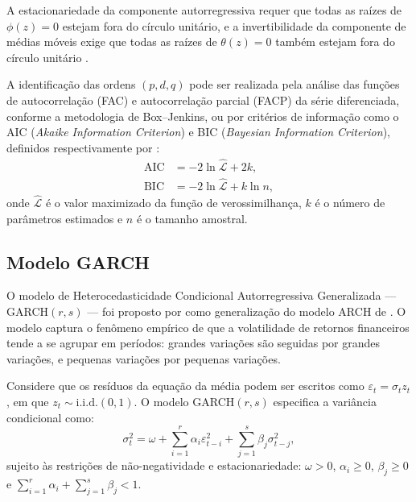 A estacionariedade da componente autorregressiva requer que todas as raízes
de $\phi(z) = 0$ estejam fora do círculo unitário, e a invertibilidade da
componente de médias móveis exige que todas as raízes de $\theta(z) = 0$
também estejam fora do círculo unitário \cite{box1970}.

A identificação das ordens $(p, d, q)$ pode ser realizada pela análise das
funções de autocorrelação (FAC) e autocorrelação parcial (FACP) da série
diferenciada, conforme a metodologia de Box--Jenkins, ou por critérios de
informação como o AIC (\emph{Akaike Information Criterion}) e BIC
(\emph{Bayesian Information Criterion}), definidos respectivamente
por \cite{akaike1974,schwarz1978}:
%
\begin{align}
    \text{AIC} &= -2\ln\hat{\mathcal{L}} + 2k, \label{eq:aic}\\
    \text{BIC} &= -2\ln\hat{\mathcal{L}} + k\ln n, \label{eq:bic}
\end{align}
%
onde $\hat{\mathcal{L}}$ é o valor maximizado da função de verossimilhança,
$k$ é o número de parâmetros estimados e $n$ é o tamanho amostral.

\subsection{Modelo GARCH}
\label{subsec:garch}

O modelo de Heterocedasticidade Condicional Autorregressiva Generalizada ---
GARCH$(r,s)$ --- foi proposto por  como
generalização do modelo ARCH de . O modelo captura o
fenômeno empírico de que a volatilidade de retornos financeiros tende a se
agrupar em períodos: grandes variações são seguidas por grandes variações, e
pequenas variações por pequenas variações.

Considere que os resíduos da equação da média podem ser escritos como
$\varepsilon_t = \sigma_t z_t$, em que $z_t \sim \text{i.i.d.}(0,1)$. O
modelo GARCH$(r,s)$ especifica a variância condicional como:
%
\begin{equation}
    \label{eq:garch}
    \sigma_t^2 = \omega +
    \sum_{i=1}^{r} \alpha_i \varepsilon_{t-i}^2 +
    \sum_{j=1}^{s} \beta_j \sigma_{t-j}^2,
\end{equation}
%
sujeito às restrições de não-negatividade e estacionariedade:
$\omega > 0$, $\alpha_i \ge 0$, $\beta_j \ge 0$ e
$\sum_{i=1}^{r}\alpha_i + \sum_{j=1}^{s}\beta_j < 1$.

